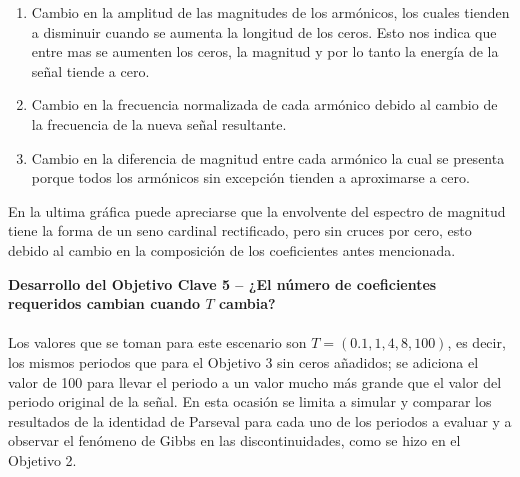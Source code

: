 \documentclass[8pt]{article}
\begin{document}
    \begin{enumerate}
        \item Cambio en la amplitud de las magnitudes de los armónicos, los cuales tienden a 
            disminuir cuando se aumenta la longitud de los ceros. Esto nos indica que entre 
            mas se aumenten los ceros, la magnitud y por lo tanto la energía de la señal tiende 
            a cero.
        \item Cambio en la frecuencia normalizada de cada armónico debido al cambio de la 
            frecuencia de la nueva señal resultante.
        \item Cambio en la diferencia de magnitud entre cada armónico la cual se presenta 
            porque todos los armónicos sin excepción tienden a aproximarse a cero.
    \end{enumerate}

    En la ultima gráfica puede apreciarse que la envolvente del espectro de magnitud tiene la 
    forma de un seno cardinal rectificado, pero sin cruces por cero, esto debido al cambio en 
    la composición de los coeficientes antes mencionada.

    \textbf{Desarrollo del Objetivo Clave 5 -- ¿El número de coeficientes requeridos cambian cuando $T$ cambia?}
    \\\\
    Los valores que se toman para este escenario son $T=(0.1,1,4,8,100)$, es decir, los mismos 
    periodos que para el Objetivo 3 sin ceros añadidos; se adiciona el valor de 100 para llevar el 
    periodo a un valor mucho más grande que el valor del periodo original de la señal. En esta 
    ocasión se limita a simular y comparar los resultados de la identidad de Parseval para cada uno de 
    los periodos a evaluar y a observar el fenómeno de Gibbs en las discontinuidades, como se hizo en 
    el Objetivo 2.

    \begin{table}
        
    \end{table}
\end{document}
